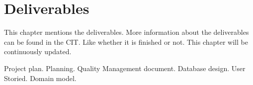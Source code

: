 \chapter{Deliverables}
This chapter mentions the deliverables. More information about the deliverables can be found in the CIT. Like whether it is finished or not. This chapter will be continuously updated.

Project plan.
Planning.
Quality Management document.
Database design.
User Storied.
Domain model.